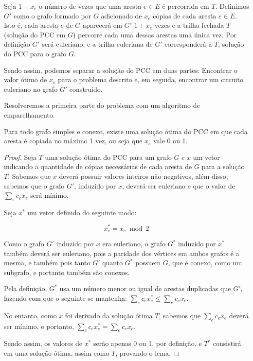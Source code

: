 Seja $1 + x_e$ o número de vezes que uma aresta $e \in E$ é percorrida em $T$.
Definimos $G'$ como o grafo formado por $G$ adicionado de $x_e$ cópias de cada aresta $e \in E$. 
Isto é, cada aresta $e$ de $G$ aparecerá em $G'$ $1 + x_e$ vezes e a trilha fechada $T$ (solução do PCC em $G$) percorre cada uma dessas arestas uma única vez.
Por definição $G'$ será euleriano, e a trilha euleriana de $G'$ corresponderá à $T$, solução do PCC para o grafo $G$.

Sendo assim, podemos separar a solução do PCC em duas partes: Encontrar o valor ótimo de $x_e$ para o problema descrito e, em seguida, encontrar um circuito euleriano no grafo $G'$ construído.

Resolveremos a primeira parte do problema com um algoritmo de emparelhamento.



\begin{lemma} 
    \label{lemma-pcc}
    Para todo grafo simples e conexo, existe uma solução ótima do PCC em que cada aresta é copiada no máximo 1 vez, ou seja que $x_e$ vale 0 ou 1. 
\end{lemma}

\begin{proof}
    Seja $T$ uma solução ótima do PCC para um grafo $G$ e $x$ um vetor indicando a quantidade de cópias necessárias de cada aresta de $G$ para a solução $T$. 
    Sabemos que $x$ deverá possuir valores inteiros não negativos, além disso, sabemos que o grafo $G'$, induzido por $x$, deverá ser euleriano e que o valor de $\sum_e c_ex_e$ será mínimo.

    Seja $x^*$ um vetor definido do seguinte modo:

    \[  x^*_e = x_e \bmod 2    \]

    Como o grafo $G'$ induzido por $x$ era euleriano, o grafo $G^*$ induzido por $x^*$ também deverá ser euleriano, pois a paridade dos vértices em ambos grafos é a mesma, e também pois tanto $G'$ quanto $G^*$ possuem $G$, que é conexo, como um subgrafo, e portanto também são conexos.
    
    Pela definição, $G^*$ usa um número menor ou igual de arestas duplicadas que $G'$, fazendo com que o seguinte se mantenha: $\sum_e c_ex^*_e \leq \sum_e c_ex_e$.

    No entanto, como $x$ foi derivado da solução ótima $T$, sabemos que $\sum_e c_ex_e$ deverá ser mínimo, e portanto, $\sum_e c_ex^*_e = \sum_e c_ex_e$. 

    Sendo assim, os valores de $x^*$ serão apenas 0 ou 1, por definição, e $T^*$ consistirá em uma solução ótima, assim como $T$, provando o lema.

\end{proof}

